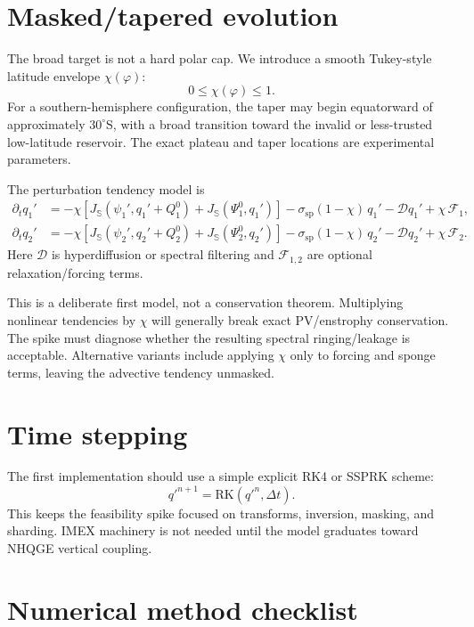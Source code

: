\documentclass[11pt]{article}
\newcommand{\Dt}{\Delta t}
\newcommand{\jacS}{J_{\mathbb{S}}}
\newcommand{\chiM}{\chi}
\newcommand{\sponge}{\sigma_{\mathrm{sp}}}
\begin{document}
\section{Masked/tapered evolution}

The broad target is not a hard polar cap.  We introduce a smooth
Tukey-style latitude envelope $\chiM(\varphi)$:
\begin{equation}
  0 \le \chiM(\varphi) \le 1.
\end{equation}
For a southern-hemisphere configuration, the taper may begin equatorward
of approximately $30^\circ$S, with a broad transition toward the invalid
or less-trusted low-latitude reservoir.  The exact plateau and taper
locations are experimental parameters.

The perturbation tendency model is
\begin{align}
  \partial_t q_1'
  &=
  -\chiM\left[
    \jacS(\psi_1',q_1'+Q_1^0)
    + \jacS(\Psi_1^0,q_1')
  \right]
  - \sponge(1-\chiM)\,q_1'
  - \mathcal{D}q_1'
  + \chiM\,\mathcal{F}_1,\\
  \partial_t q_2'
  &=
  -\chiM\left[
    \jacS(\psi_2',q_2'+Q_2^0)
    + \jacS(\Psi_2^0,q_2')
  \right]
  - \sponge(1-\chiM)\,q_2'
  - \mathcal{D}q_2'
  + \chiM\,\mathcal{F}_2.
  \label{eq:tendency}
\end{align}
Here $\mathcal{D}$ is hyperdiffusion or spectral filtering and
$\mathcal{F}_{1,2}$ are optional relaxation/forcing terms.

This is a deliberate first model, not a conservation theorem.  Multiplying
nonlinear tendencies by $\chiM$ will generally break exact PV/enstrophy
conservation.  The spike must diagnose whether the resulting spectral
ringing/leakage is acceptable.  Alternative variants include applying
$\chiM$ only to forcing and sponge terms, leaving the advective tendency
unmasked.

\section{Time stepping}

The first implementation should use a simple explicit RK4 or SSPRK scheme:
\begin{equation}
  q'^{n+1} = \mathrm{RK}(q'^n,\Dt).
\end{equation}
This keeps the feasibility spike focused on transforms, inversion, masking,
and sharding.  IMEX machinery is not needed until the model graduates toward
NHQGE vertical coupling.

\section{Numerical method checklist}
\end{document}
